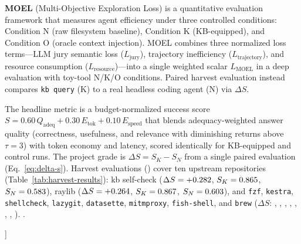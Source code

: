 \documentclass[10pt,twocolumn]{article}
\begin{document}
  \textbf{MOEL} (Multi-Objective Exploration Loss) is a quantitative evaluation
  framework that measures agent efficiency under three controlled conditions:
  Condition N (raw filesystem baseline), Condition K (KB-equipped), and Condition
  O (oracle context injection).  MOEL combines three normalized loss terms—LLM jury semantic loss ($L_\text{jury}$),
  trajectory inefficiency ($L_\text{trajectory}$), and resource consumption
  ($L_\text{resource}$)—into a single weighted scalar $L_\text{MOEL}$ in a deep
  evaluation with toy-tool N/K/O conditions.  Paired harvest evaluation instead compares
  \texttt{kb query} (K) to a real headless coding agent (N) via $\Delta S$.

  The headline metric is a budget-normalized success score
  $S = 0.60\,Q_{\text{adeq}} + 0.30\,E_{\text{tok}} + 0.10\,E_{\text{speed}}$ that
  blends adequacy-weighted answer quality (correctness, usefulness, and
  relevance with diminishing returns above $\tau{=}3$) with token economy and
  latency, scored identically for KB-equipped and control runs.  The project grade is
  $\Delta S = S_K - S_N$ from a single paired evaluation (Eq.~\ref{eq:delta-s}).
  Harvest evaluations (\ResultsUpdated{}) cover ten upstream repositories
  (Table~\ref{tab:harvest-results}): kb self-check
  ($\Delta S = +0.282{}$, $S_K = 0.865{}$, $S_N = 0.583{}$),
  raylib ($\Delta S = +0.264{}$, $S_K = 0.867{}$, $S_N = 0.603{}$),
  and \texttt{fzf}, \texttt{kestra}, \texttt{shellcheck}, \texttt{lazygit},
  \texttt{datasette}, \texttt{mitmproxy}, \texttt{fish-shell}, and \texttt{brew}
  ($\Delta S$: \FzfDeltaS, \KestraDeltaS, \ShellcheckDeltaS, \LazygitDeltaS,
  \DatasetteDeltaS, \MitmproxyDeltaS, \FishShellDeltaS, \BrewDeltaS).
  \ResultsControlStatus{}.

  \vspace{0.85em}
]









\end{document}
